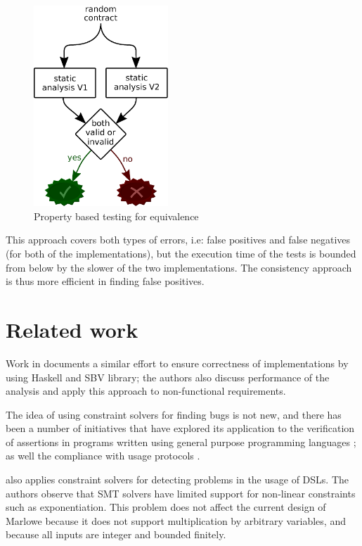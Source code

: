 \documentclass[english,runningheads]{llncs}
\begin{document}
\begin{figure}
\begin{centering}
\includegraphics[width=0.45\textwidth]{figures/equivalence_property}
\par\end{centering}
\caption{Property based testing for equivalence\label{fig:Property-based-testing-for-equivalence}}
\end{figure}

This approach covers both types of errors, i.e: false positives and
false negatives (for both of the implementations), but the execution
time of the tests is bounded from below by the slower of the two implementations.
The consistency approach is thus more efficient in finding false positives.

\section{Related work}

Work in \cite{mokhov2019formal} documents a similar effort to ensure
correctness of implementations by using Haskell and SBV library; the
authors also discuss performance of the analysis and apply this approach
to non-functional requirements.

The idea of using constraint solvers for finding bugs is not new,
and there has been a number of initiatives that have explored its
application to the verification of assertions in programs written
using general purpose programming languages \cite{gulwani2008program,jackson2000finding};
as well the compliance with usage protocols \cite{ball2001automatically,xie2005saturn}.

\cite{keshishzadeh2013early} also applies constraint solvers for
detecting problems in the usage of DSLs. The authors observe that
SMT solvers have limited support for non-linear constraints such as
exponentiation. This problem does not affect the current design of
Marlowe because it does not support multiplication by arbitrary variables,
and because all inputs are integer and bounded finitely.
\end{document}
